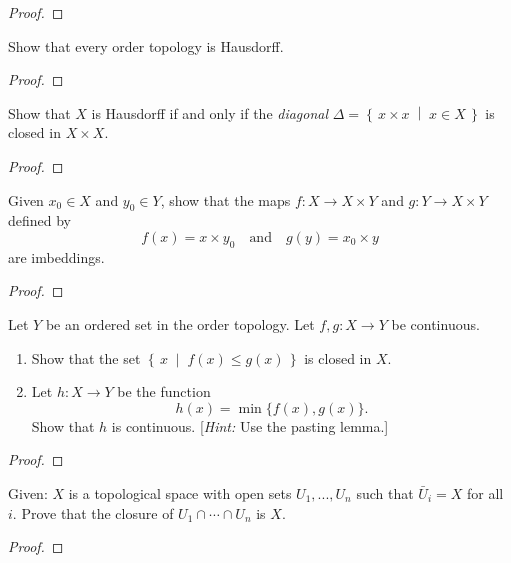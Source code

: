 \begin{proof}
\end{proof}
\newpage
\begin{problem}[Munkres \S17, p.\,101, 10]
Show that every order topology is Hausdorff.
\end{problem}
\begin{proof}
\end{proof}
\newpage
\begin{problem}[Munkres \S17, p.\,101, 13]
Show that $X$ is Hausdorff if and only if the \emph{diagonal}
$\Delta=\left\{\,x\times x\;\middle|\;x\in X\,\right\}$ is closed
in $X\times X$.
\end{problem}
\begin{proof}
\end{proof}
\newpage
\begin{problem}[Munkres \S18, p.\,111, 4]
Given $x_0\in X$ and $y_0\in Y$, show that the maps $f\colon X\to
X\times Y$ and $g\colon Y\to X\times Y$ defined by
\[
f(x)=x\times y_0\quad\text{and}\quad g(y)=x_0\times y
\]
are imbeddings.
\end{problem}
\begin{proof}
\end{proof}
\newpage
\begin{problem}[Munkres \S18, p.\,111-112, 8(a,b)]
Let $Y$ be an ordered set in the order topology. Let
$f,g\colon X\to Y$ be continuous.
\begin{enumerate}[noitemsep,label=(\alph*)]
\item Show that the set
  $\left\{\,x\;\middle|\;f(x)\leq g(x)\,\right\}$ is closed in $X$.
\item Let $h\colon X\to Y$ be the
  function \[h(x)=\min\{f(x),g(x)\}.\] Show that $h$ is
  continuous. [\emph{Hint:} Use the pasting lemma.]
\end{enumerate}
\end{problem}
\begin{proof}
\end{proof}
\newpage
\begin{problem}
Given: $X$ is a topological space with open sets $U_1,...,U_n$
such that $\bar U_i=X$ for all $i$. Prove that the closure of
$U_1\cap\cdots\cap U_n$ is $X$.
\end{problem}
\begin{proof}
\end{proof}

